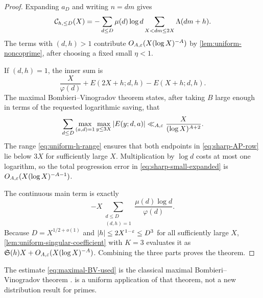 \begin{proof}
Expanding $a_D$ and writing $n=dm$ gives
\begin{equation}\label{eq:sharp-small-expanded}
 \mathcal C_{h,\le D}(X)
 =-\sum_{d\le D}\mu(d)\log d
   \sum_{X<dm\le2X}\Lambda(dm+h).
\end{equation}
The terms with $(d,h)>1$ contribute $O_{A,\varepsilon}(X(\log X)^{-A})$ by
\cref{lem:uniform-noncoprime}, after choosing a fixed small $\eta<1$.

If $(d,h)=1$, the inner sum is
\begin{equation}\label{eq:sharp-AP-row}
 \frac X{\varphi(d)}
 +E(2X+h;d,h)-E(X+h;d,h).
\end{equation}
The maximal Bombieri--Vinogradov theorem states, after taking $B$ large
enough in terms of the requested logarithmic saving, that
\begin{equation}\label{eq:maximal-BV-used}
 \sum_{d\le D}
 \max_{(a,d)=1}\max_{y\le3X}
 |E(y;d,a)|
 \ll_{A,\varepsilon}\frac{X}{(\log X)^{A+2}}.
\end{equation}
The range \eqref{eq:uniform-h-range} ensures that both endpoints in
\eqref{eq:sharp-AP-row} lie below $3X$ for sufficiently large $X$.
Multiplication by $\log d$ costs at most one logarithm, so the total
progression error in \eqref{eq:sharp-small-expanded} is
$O_{A,\varepsilon}(X(\log X)^{-A-1})$.

The continuous main term is exactly
\[
 -X\sum_{\substack{d\le D\\(d,h)=1}}
 \frac{\mu(d)\log d}{\varphi(d)}.
\]
Because $D=X^{1/2+o(1)}$ and
$|h|\le2X^{1-\varepsilon}\le D^3$ for all sufficiently large $X$,
\cref{lem:uniform-singular-coefficient} with $K=3$ evaluates it as
$\mathfrak S(h)X+O_{A,\varepsilon}(X(\log X)^{-A})$.  Combining the three parts
proves the theorem.
\end{proof}

\begin{remark}
The estimate \eqref{eq:maximal-BV-used} is the classical maximal
Bombieri--Vinogradov theorem \citep{Bombieri1965,Vinogradov1965,
IwaniecKowalski2004}.   is a uniform
application of that theorem, not a new distribution result for primes.
\end{remark}
